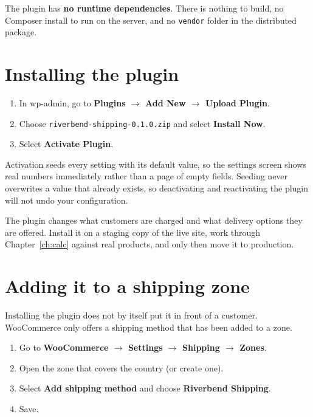\documentclass[11pt,a4paper,oneside]{report}
\newcommand{\opt}[1]{\texttt{\small #1}}
\newcommand{\menu}[1]{\textsf{\textbf{#1}}}
\begin{document}
The plugin has \textbf{no runtime dependencies}. There is nothing to build, no
Composer install to run on the server, and no \opt{vendor} folder in the distributed
package.

\section{Installing the plugin}

\begin{enumerate}
  \item In wp-admin, go to \menu{Plugins $\rightarrow$ Add New $\rightarrow$ Upload Plugin}.
  \item Choose \opt{riverbend-shipping-0.1.0.zip} and select \menu{Install Now}.
  \item Select \menu{Activate Plugin}.
\end{enumerate}

Activation seeds every setting with its default value, so the settings screen shows
real numbers immediately rather than a page of empty fields. Seeding never overwrites
a value that already exists, so deactivating and reactivating the plugin will not
undo your configuration.

\begin{housewarn}
The plugin changes what customers are charged and what delivery options they are
offered. Install it on a staging copy of the live site, work through
Chapter~\ref{ch:calc} against real products, and only then move it to production.
\end{housewarn}

\section{Adding it to a shipping zone}

Installing the plugin does not by itself put it in front of a customer. WooCommerce
only offers a shipping method that has been added to a zone.

\begin{enumerate}
  \item Go to \menu{WooCommerce $\rightarrow$ Settings $\rightarrow$ Shipping $\rightarrow$ Zones}.
  \item Open the zone that covers the country (or create one).
  \item Select \menu{Add shipping method} and choose \menu{Riverbend Shipping}.
  \item Save.
\end{enumerate}
\end{document}
